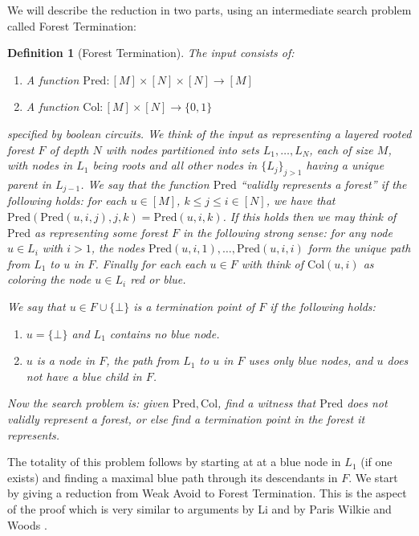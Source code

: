 \documentclass[11pt]{article}
\newtheorem{definition}{Definition}
\newcommand{\B}{\{0,1\}}
\begin{document}
\medskip
We will describe the reduction in two parts, using an intermediate search problem called Forest Termination:
\begin{definition}[Forest Termination]\label{def:forest}
The input consists of:
\begin{enumerate}
    \item A function $\mathrm{Pred}: [M] \times [N] \times [N] \to [M]$
    \item A function $\mathrm{Col}:[M] \times [N] \to \B$
\end{enumerate}
specified by boolean circuits. We think of the input as representing a layered rooted forest $F$ of depth $N$ with nodes partitioned into sets $L_1, \ldots, L_{N}$, each of size $M$, with nodes in $L_1$ being roots and all other nodes in $\{L_j\}_{j> 1}$ having a unique parent in $L_{j-1}$. We say that the function $\mathrm{Pred}$ ``validly represents a forest'' if the following holds: for each $u \in [M]$, $k \leq j \leq i \in [N]$, we have that $\mathrm{Pred}(\mathrm{Pred}(u,i,j),j,k) = \mathrm{Pred}(u,i,k)$. If this holds then we may think of $\mathrm{Pred}$ as representing some forest $F$ in the following strong sense: for any node $u \in L_i$ with $i >1$, the nodes $\mathrm{Pred}(u, i, 1),\ldots, \mathrm{Pred}(u,i,i)$ form the unique path from $L_1$ to $u$ in $F$. Finally for each each $u \in F$ with think of $\mathrm{Col}(u, i)$ as coloring the node $u \in L_i$ red or blue.

We say that $u \in F \cup \{\bot\}$ is a termination point of $F$ if the following holds:
\begin{enumerate}
    \item $u = \{\bot\}$ and $L_1$ contains no blue node.
    \item $u$ is a node in $F$, the path from $L_1$ to $u$ in $F$ uses only blue nodes, and $u$ does not have a blue child in $F$.
\end{enumerate}

Now the search problem is: given $\mathrm{Pred}, \mathrm{Col}$, find a witness that $\mathrm{Pred}$ does not validly represent a forest, or else find a termination point in the forest it represents.
\end{definition}
The totality of this problem follows by starting at at a blue node in $L_1$ (if one exists) and finding a maximal blue path through its descendants in $F$. We start by giving a reduction from Weak Avoid to Forest Termination. This is the aspect of the proof which is very similar to arguments by Li and by Paris Wilkie and Woods \cite{Li,Paris-Wilkie-Woods}.
\end{document}

